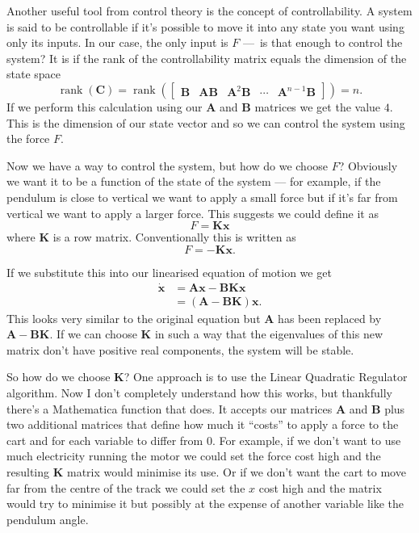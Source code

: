 \documentclass{article}
\DeclareMathOperator{\rank}{rank}
\renewcommand{\vec}[1]{\boldsymbol{\mathbf{#1}}}
\newcommand{\dvec}[1]{\dot{\vec{#1}}}
\begin{document}
Another useful tool from control theory is the concept of controllability. A system is said to be controllable if it's possible to move it into any state you want using only its inputs. In our case, the only input is $F$ — is that enough to control the system? It is if the rank of the controllability matrix equals the dimension of the state space \[\rank(\vec{C}) = \rank(\begin{bmatrix}
      \vec{B} & \vec{A} \vec{B} & \vec{A}^2 \vec{B} & \cdots & \vec{A}^{n - 1} \vec{B}
    \end{bmatrix}) = n.\] If we perform this calculation using our $\vec{A}$ and $\vec{B}$ matrices we get the value $4$. This is the dimension of our state vector and so we can control the system using the force $F$.

Now we have a way to control the system, but how do we choose $F$? Obviously we want it to be a function of the state of the system — for example, if the pendulum is close to vertical we want to apply a small force but if it's far from vertical we want to apply a larger force. This suggests we could define it as \[F = \vec{K} \vec{x}\] where $\vec{K}$ is a row matrix. Conventionally this is written as \[F = -\vec{K} \vec{x}.\]

If we substitute this into our linearised equation of motion we get \begin{align*}
  \dvec{x} & = \vec{A} \vec{x} - \vec{B} \vec{K} \vec{x} \\
           & = (\vec{A} - \vec{B} \vec{K}) \vec{x}.
\end{align*} This looks very similar to the original equation but $\vec{A}$ has been replaced by $\vec{A} - \vec{B} \vec{K}$. If we can choose $\vec{K}$ in such a way that the eigenvalues of this new matrix don't have positive real components, the system will be stable.

So how do we choose $\vec{K}$? One approach is to use the Linear Quadratic Regulator algorithm. Now I don't completely understand how this works, but thankfully there's a Mathematica function that does. It accepts our matrices $\vec{A}$ and $\vec{B}$ plus two additional matrices that define how much it ``costs'' to apply a force to the cart and for each variable to differ from $0$. For example, if we don't want to use much electricity running the motor we could set the force cost high and the resulting $\vec{K}$ matrix would minimise its use. Or if we don't want the cart to move far from the centre of the track we could set the $x$ cost high and the matrix would try to minimise it but possibly at the expense of another variable like the pendulum angle.
\end{document}
